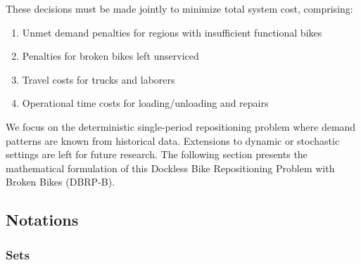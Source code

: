 These decisions must be made jointly to minimize total system cost, comprising:
\begin{enumerate}
    \item Unmet demand penalties for regions with insufficient functional bikes
    \item Penalties for broken bikes left unserviced
    \item Travel costs for trucks and laborers
    \item Operational time costs for loading/unloading and repairs
\end{enumerate}

We focus on the deterministic single-period repositioning problem where demand patterns are known from historical data. Extensions to dynamic or stochastic settings are left for future research. The following section presents the mathematical formulation of this Dockless Bike Repositioning Problem with Broken Bikes (DBRP-B).

\subsection{Notations}

\subsubsection{Sets}

